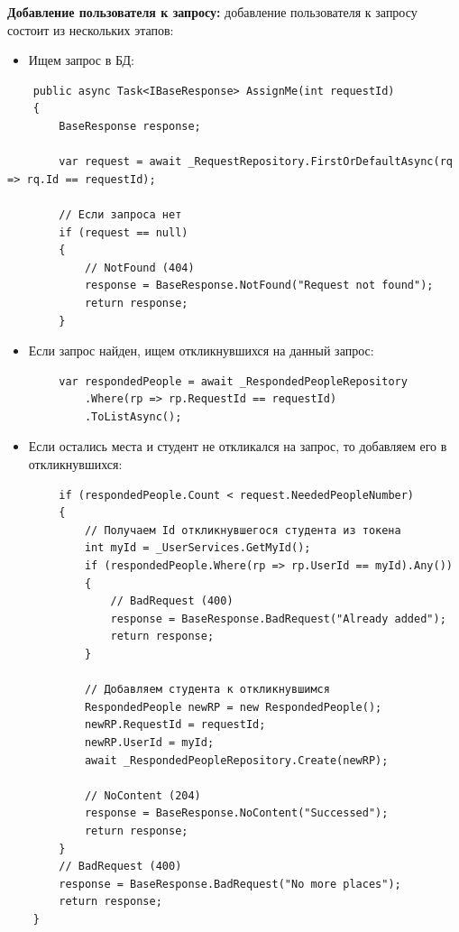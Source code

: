 \textbf{Добавление пользователя к запросу:} добавление пользователя к запросу состоит из нескольких этапов:
\begin{itemize}
	\item{Ищем запрос в БД:}
\end{itemize}
\begin{verbatim}
    public async Task<IBaseResponse> AssignMe(int requestId)
    {
        BaseResponse response;

        var request = await _RequestRepository.FirstOrDefaultAsync(rq => rq.Id == requestId);

        // Если запроса нет
        if (request == null)
        {
            // NotFound (404)
            response = BaseResponse.NotFound("Request not found");
            return response;
        }

\end{verbatim}

\begin{itemize}
	\item{Если запрос найден, ищем откликнувшихся на данный запрос:}
\end{itemize}
\begin{verbatim}
        var respondedPeople = await _RespondedPeopleRepository
            .Where(rp => rp.RequestId == requestId)
            .ToListAsync();
\end{verbatim}

\begin{itemize}
	\item{Если остались места и студент не откликался на запрос, то добавляем его в откликнувшихся:}
\end{itemize}
\begin{verbatim}
        if (respondedPeople.Count < request.NeededPeopleNumber)
        {
            // Получаем Id откликнувшегося студента из токена
            int myId = _UserServices.GetMyId();
            if (respondedPeople.Where(rp => rp.UserId == myId).Any())
            {
                // BadRequest (400)
                response = BaseResponse.BadRequest("Already added");
                return response;
            }

            // Добавляем студента к откликнувшимся
            RespondedPeople newRP = new RespondedPeople();
            newRP.RequestId = requestId;
            newRP.UserId = myId;
            await _RespondedPeopleRepository.Create(newRP);

            // NoContent (204)
            response = BaseResponse.NoContent("Successed");
            return response;
        }
        // BadRequest (400)
        response = BaseResponse.BadRequest("No more places");
        return response;
    }
\end{verbatim}


